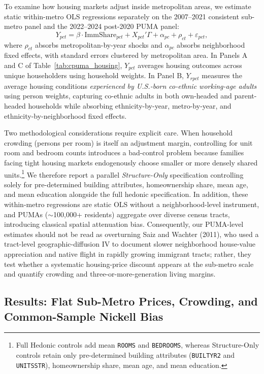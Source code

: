 \documentclass[11pt]{article}
\begin{document}
To examine how housing markets adjust inside metropolitan areas, we estimate static within-metro OLS regressions separately on the 2007--2021 consistent sub-metro panel and the 2022--2024 post-2020 PUMA panel:
\begin{equation}
Y_{pct} = \beta \cdot \text{ImmShare}_{pct} + X_{pct}'\Gamma + \alpha_{pc} + \rho_{ct} + \varepsilon_{pct},
\end{equation}
where $\rho_{ct}$ absorbs metropolitan-by-year shocks and $\alpha_{pc}$ absorbs neighborhood fixed effects, with standard errors clustered by metropolitan area. In Panels A and C of Table~\ref{tab:cpuma_housing}, $Y_{pct}$ averages housing outcomes across unique householders using household weights. In Panel B, $Y_{rpct}$ measures the average housing conditions \emph{experienced by U.S.-born co-ethnic working-age adults} using person weights, capturing co-ethnic adults in both own-headed and parent-headed households while absorbing ethnicity-by-year, metro-by-year, and ethnicity-by-neighborhood fixed effects.

Two methodological considerations require explicit care. When household crowding (persons per room) is itself an adjustment margin, controlling for unit room and bedroom counts introduces a bad-control problem because families facing tight housing markets endogenously choose smaller or more densely shared units.\footnote{Full Hedonic controls add mean \texttt{ROOMS} and \texttt{BEDROOMS}, whereas Structure-Only controls retain only pre-determined building attributes (\texttt{BUILTYR2} and \texttt{UNITSSTR}), homeownership share, mean age, and mean education.} We therefore report a parallel \emph{Structure-Only} specification controlling solely for pre-determined building attributes, homeownership share, mean age, and mean education alongside the full hedonic specification. In addition, these within-metro regressions are static OLS without a neighborhood-level instrument, and PUMAs ($\sim$100,000+ residents) aggregate over diverse census tracts, introducing classical spatial attenuation bias. Consequently, our PUMA-level estimates should not be read as overturning Saiz and Wachter (2011), who used a tract-level geographic-diffusion IV to document slower neighborhood house-value appreciation and native flight in rapidly growing immigrant tracts; rather, they test whether a systematic housing-price discount appears at the sub-metro scale and quantify crowding and three-or-more-generation living margins.

\subsection{Results: Flat Sub-Metro Prices, Crowding, and Common-Sample Nickell Bias}
\end{document}
